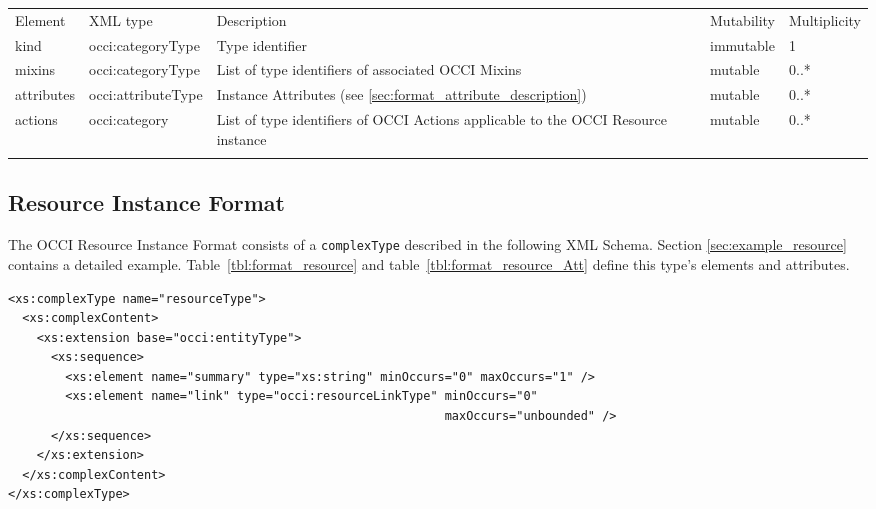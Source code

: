 \documentclass[10pt,a4paper]{article}
\begin{document}
 {
    \begin{tabularx}{\textwidth}{llXll}
    \toprule
    Element & XML type & Description & Mutability & Multiplicity \\
    \colrule
    kind & occi:categoryType & Type identifier & immutable & 1 \\

    mixins & occi:categoryType & List of type identifiers of associated OCCI Mixins & mutable & 0..* \\

    attributes & occi:attributeType & Instance Attributes (see
\ref{sec:format_attribute_description}) & mutable & 0..* \\
    
    actions & occi:category & List of type identifiers of OCCI
Actions applicable to the OCCI Resource instance & mutable & 0..* \\
    \botrule
    \end{tabularx}
}
\FloatBarrier

\subsection{Resource Instance Format}
\label{sec:format_resource}

The OCCI Resource Instance Format consists of a \texttt{complexType}
described in the following XML Schema.  Section
\ref{sec:example_resource} contains a detailed example.
Table~\ref{tbl:format_resource} and
table~\ref{tbl:format_resource_Att} define this type's elements and
attributes.

\begin{lstlisting}
<xs:complexType name="resourceType">
  <xs:complexContent>
    <xs:extension base="occi:entityType">
      <xs:sequence>
        <xs:element name="summary" type="xs:string" minOccurs="0" maxOccurs="1" />
        <xs:element name="link" type="occi:resourceLinkType" minOccurs="0" 
                                                             maxOccurs="unbounded" />
      </xs:sequence>
    </xs:extension>
  </xs:complexContent>
</xs:complexType>
\end{lstlisting}
\end{document}
